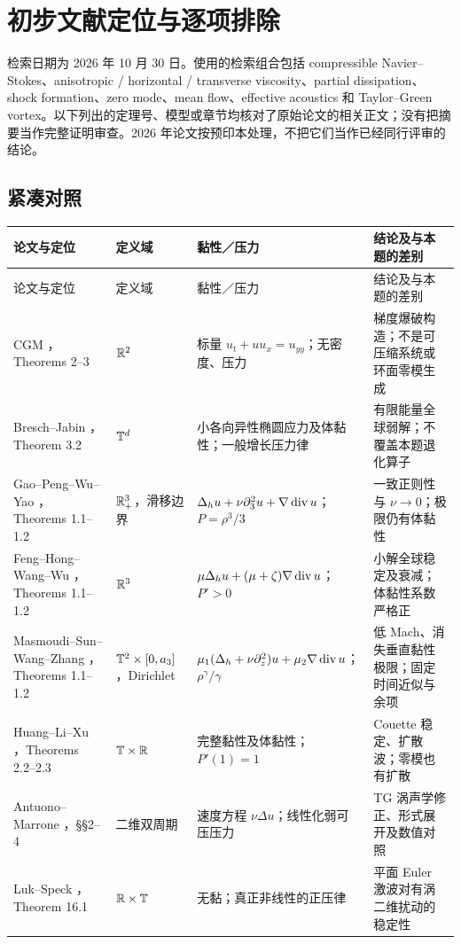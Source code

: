\section{初步文献定位与逐项排除}
检索日期为 2026 年 10 月 30 日。使用的检索组合包括 compressible Navier--Stokes、anisotropic / horizontal / transverse viscosity、partial dissipation、shock formation、zero mode、mean flow、effective acoustics 和 Taylor--Green vortex。以下列出的定理号、模型或章节均核对了原始论文的相关正文；没有把摘要当作完整证明审查。2026 年论文按预印本处理，不把它们当作已经同行评审的结论。

\subsection{紧凑对照}
\small
\begin{longtable}{@{}>{\raggedright\arraybackslash}p{}>{\raggedright\arraybackslash}p{}>{\raggedright\arraybackslash}p{}>{\raggedright\arraybackslash}p{}@{}}
\toprule
论文与定位 & 定义域 & 黏性／压力 & 结论及与本题的差别\\
\midrule
\endfirsthead
\toprule
论文与定位 & 定义域 & 黏性／压力 & 结论及与本题的差别\\
\midrule
\endhead
CGM \cite{CGM}，Theorems 2--3 & $\mathbb R^2$ & 标量 $u_t+uu_x=u_{yy}$；无密度、压力 & 梯度爆破构造；不是可压缩系统或环面零模生成\\[4pt]
Bresch--Jabin \cite{BJ}，Theorem 3.2 & $\mathbb T^d$ & 小各向异性椭圆应力及体黏性；一般增长压力律 & 有限能量全球弱解；不覆盖本题退化算子\\[4pt]
Gao--Peng--Wu--Yao \cite{GPWY}，Theorems 1.1--1.2 & $\mathbb R^3_+$，滑移边界 & $\Delta_hu+\nu\partial_3^2u+\nabla\operatorname{div} u$；$P=\rho^3/3$ & 一致正则性与 $\nu\to0$；极限仍有体黏性\\[4pt]
Feng--Hong--Wang--Wu \cite{FHWW}，Theorems 1.1--1.2 & $\mathbb R^3$ & $\mu\Delta_hu+(\mu+\zeta)\nabla\operatorname{div} u$；$P'>0$ & 小解全球稳定及衰减；体黏性系数严格正\\[4pt]
Masmoudi--Sun--Wang--Zhang \cite{MSWZ}，Theorems 1.1--1.2 & $\mathbb T^2\times[0,a_3]$，Dirichlet & $\mu_1(\Delta_h+\nu\partial_z^2)u+\mu_2\nabla\operatorname{div} u$；$\rho^\gamma/\gamma$ & 低 Mach、消失垂直黏性极限；固定时间近似与余项\\[4pt]
Huang--Li--Xu \cite{HLX}，Theorems 2.2--2.3 & $\mathbb T\times\mathbb R$ & 完整黏性及体黏性；$P'(1)=1$ & Couette 稳定、扩散波；零模也有扩散\\[4pt]
Antuono--Marrone \cite{AM}，\S\S2--4 & 二维双周期 & 速度方程 $\nu\Delta u$；线性化弱可压压力 & TG 涡声学修正、形式展开及数值对照\\[4pt]
Luk--Speck \cite{LS}，Theorem 16.1 & $\mathbb R\times\mathbb T$ & 无黏；真正非线性的正压律 & 平面 Euler 激波对有涡二维扰动的稳定性\\
\bottomrule
\end{longtable}
\normalsize

